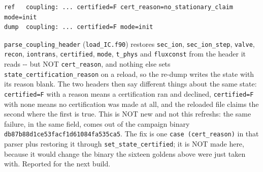 \documentclass[english,a4paper]{my_memo}
\begin{document}
\begin{verbatim}
ref   coupling: ... certified=F cert_reason=no_stationary_claim mode=init
dump  coupling: ... certified=F mode=init
\end{verbatim}

\texttt{parse\_coupling\_header} (\texttt{load\_IC.f90}) restores \texttt{sec\_ion}, \texttt{sec\_ion\_step},
\texttt{valve}, \texttt{recon}, \texttt{iontrans}, \texttt{certified}, \texttt{mode}, \texttt{t\_phys} and \texttt{fluxconst}
from the header it reads -\/- but NOT \texttt{cert\_reason}, and nothing else sets
\texttt{state\_certification\_reason} on a reload, so the re-dump writes the state with
its reason blank. The two headers then say different things about the same
state: \texttt{certified=F} with a reason means a certification ran and declined,
\texttt{certified=F} with none means no certification was made at all, and the
reloaded file claims the second where the first is true. This is NOT new and
not this refresh\textquotesingle s: the same failure, in the same field, comes out of the
campaign binary \texttt{db87b88d1ce53facf1d61084fa535ca5}. The fix is one \texttt{case\ (\textquotesingle{}cert\_reason\textquotesingle{})} in that parser plus restoring it through
\texttt{set\_state\_certified}; it is NOT made here, because it would change the binary
the sixteen goldens above were just taken with. Reported for the next build.
\end{document}
